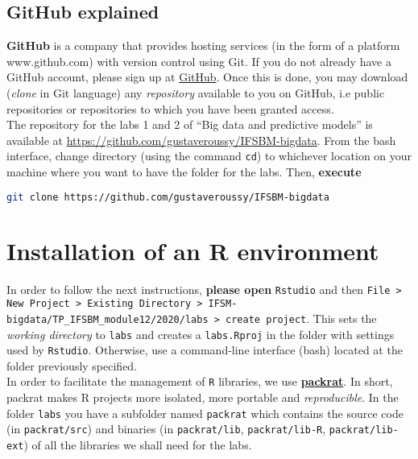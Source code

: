 \documentclass[a4paper, 11pt]{article}
\begin{document}
\subsection{GitHub explained}

\textbf{GitHub} is a company that provides hosting services (in the form of a platform www.github.com) with version 
control using Git. If you do not already have a GitHub account, please sign up at \href{www.github.com}{GitHub}. Once 
this is done, you may download (\textit{clone} in Git language) any \textit{repository} available to you on GitHub, i.e 
public repositories or repositories to which you have been granted access.\\ 

The repository for the labs 1 and 2 of “Big data and predictive models” is available at 
\href{https://github.com/gustaveroussy/IFSBM-bigdata}{https://github.com/gustaveroussy/IFSBM-bigdata}. From the bash 
interface, change directory (using the command \texttt{cd}) to whichever location on your machine where you want to have 
the folder for the labs.  Then, \textbf{execute} 
\begin{lstlisting}[language=bash]
git clone https://github.com/gustaveroussy/IFSBM-bigdata
\end{lstlisting}

\section{Installation of an R environment}

In order to follow the next instructions, \textbf{please open} \texttt{Rstudio} and then \texttt{File > New Project > 
Existing Directory > IFSM-bigdata/TP\_IFSBM\_module12/2020/labs > create project}.  This sets the \textit{working 
directory} to \texttt{labs} and creates a \texttt{labs.Rproj} in the folder with settings used by \texttt{Rstudio}.  
Otherwise, use a command-line interface (bash) located at the folder previously specified.
\\

In order to facilitate the management of \texttt{R} libraries, we use 
\href{https://rstudio.github.io/packrat/}{\textbf{packrat}}. In short, packrat makes R projects more isolated, more 
portable and \textit{reproducible}. In the folder \texttt{labs} you have a subfolder named \texttt{packrat} which 
contains the source code (in \texttt{packrat/src}) and binaries (in \texttt{packrat/lib}, \texttt{packrat/lib-R}, 
\texttt{packrat/lib-ext}) of all the libraries we shall need for the labs. 
\end{document}
